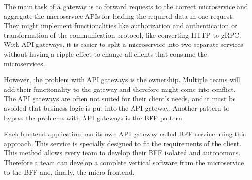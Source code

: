 \bigskip

\noindent The main task of a gateway is to forward requests to the correct microservice and aggregate the microservice \acp{API} for loading the required data in one request. They might implement functionalities like authorization and authentication or transformation of the communication protocol, like converting \ac{HTTP} to \ac{gRPC}. With \ac{API} gateways, it is easier to split a microservice into two separate services without having a ripple effect to change all clients that consume the microservices. \cite[260-263]{book:2018:richardson:background:bff:microservices-patterns}

\bigskip

\noindent However, the problem with \ac{API} gateways is the ownership. Multiple teams will add their functionality to the gateway and therefore might come into conflict. The \ac{API} gateways are often not suited for their client's needs, and it must be avoided that business logic is put into the \ac{API} gateway. Another pattern to bypass the problems with \ac{API} gateways is the \ac{BFF} pattern. \cite[265-266]{book:2018:richardson:background:bff:microservices-patterns}

\bigskip

\noindent Each frontend application has its own \ac{API} gateway called \ac{BFF} service using this approach. This service is specially designed to fit the requirements of the client. \cite[264-266]{book:2018:richardson:background:bff:microservices-patterns} \cite[71-72]{book:2021:newman:background:bff:micro-services} This method allows every team to develop their \ac{BFF} isolated and autonomous. Therefore a team can develop a complete vertical software from the microservice to the \ac{BFF} and, finally, the micro-frontend. \cite{book:2020:geers:background:micro-frontends:micro-frontends-in-action}
